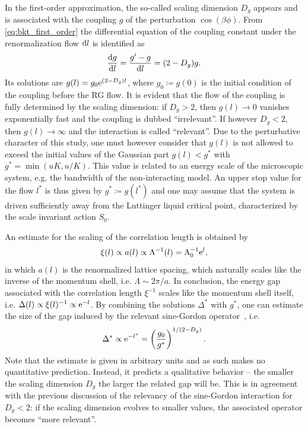 In the first-order approximation, the so-called scaling dimension $D_g$ appears and is associated with the coupling $g$ of the perturbation $\cos(\beta\phi)$.
From \cref{eq:bkt_first_order} the differential equation of the coupling constant under the renormalization flow $\mathrm d l$ is identified as
\begin{align}
    \frac{\mathrm d g}{\mathrm d l} = \frac{g'-g}{\mathrm d l} = (2-D_g)g.
\end{align}
Its solutions are $g(l) = g_0\mathrm e^{(2-D_g)l}$, where $g_0\coloneqq g(0)$ is the initial condition of the coupling before the RG flow.
It is evident that the flow of the coupling is fully determined by the scaling dimension: if $D_g>2$, then $g(l)\rightarrow0$ vanishes exponentially fast and the coupling is dubbed ``irrelevant''.
If however $D_g<2$, then $g(l)\rightarrow\infty$ and the interaction is called ``relevant''.
Due to the perturbative character of this study, one must however consider that $g(l)$ is not allowed to exceed the initial values of the Gaussian part $g(l)<g^*$ with $g^*=\min(uK,u/K)$.
This value is related to an energy scale of the microscopic system, e.g. the bandwidth of the non-interacting model.
An upper stop value for the flow $l^*$ is thus given by $g^*\coloneqq g(l^*)$ and one may assume that the system is driven sufficiently away from the Luttinger liquid critical point, characterized by the scale invariant action $S_0$.

An estimate for the scaling of the correlation length is obtained by
\begin{align}
    \xi(l) \propto a(l) \propto \Lambda^{-1}(l) = \Lambda^{-1}_0\mathrm e^{l},
    \label{eq:correlation_length_rg_flow}
\end{align}
in which $a(l)$ is the renormalized lattice spacing, which naturally scales like the inverse of the momentum shell, i.e. $\Lambda\sim2\pi/a$.
In conclusion, the energy gap associated with the correlation length $\xi^{-1}$ scales like the momentum shell itself, i.e. $\Delta(l)\propto\xi(l)^{-1}\propto\mathrm e^{-l}$.
By combining the solutions $\Delta^*$ with $g^*$, one can estimate the size of the gap induced by the relevant sine-Gordon operator~\cite{Gogolin2004}, i.e.
\begin{align}
    {\Delta^*}\propto\mathrm e^{-l^*}=\left( \frac{g_0}{g^*} \right)^{1/(2-D_g)}.
\end{align}
Note that the estimate is given in arbitrary units and as such makes no quantitative prediction.
Instead, it predicts a qualitative behavior -- the smaller the scaling dimension $D_g$ the larger the related gap will be.
This is in agreement with the previous discussion of the relevancy of the sine-Gordon interaction for $D_g<2$: if the scaling dimension evolves to smaller values, the associated operator becomes ``more relevant''.

